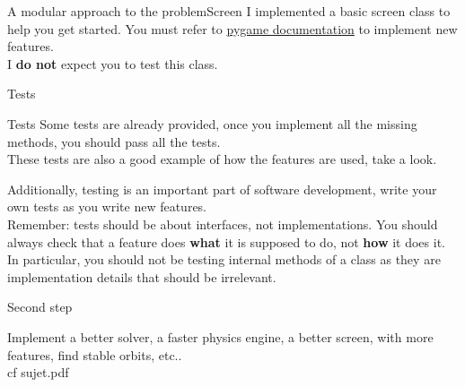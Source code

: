 \documentclass[colorlinks]{beamer}
\begin{document}
\begin{frame}[fragile]{A modular approach to the problem}{Screen}    
    I implemented a basic screen class to help you get started. You must refer to \href{https://www.pygame.org/docs/}{pygame documentation} to implement new features.\\

    I \textbf{do not} expect you to test this class.
\end{frame}

\begin{frame}\centering\Huge Tests\end{frame}

\begin{frame}{Tests}
    Some tests are already provided, once you implement all the missing methods, you should pass all the tests.\\
    These tests are also a good example of how the features are used, take a look.

    \vspace{1em}

    Additionally, testing is an important part of software development, write your own tests as you write new features.\\
    Remember: tests should be about interfaces, not implementations. You should always check that a feature does \textbf{what} it is supposed to do, not \textbf{how} it does it.\\
    In particular, you should not be testing internal methods of a class as they are implementation details that should be irrelevant.
\end{frame}

\begin{frame}{}{}
    {\centering\Huge Second step \par}

    \vspace{1em}

    Implement a better solver, a faster physics engine, a better screen, with more features, find stable orbits, etc..\\

    cf sujet.pdf    
\end{frame}
\end{document}

